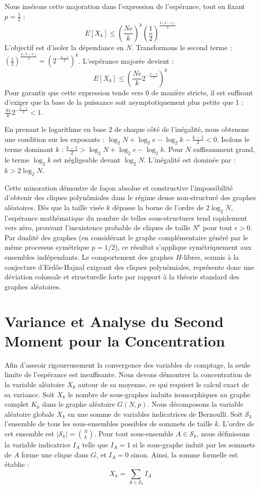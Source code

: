 \documentclass[11pt, a4paper]{article}
\begin{document}
Nous insérons cette majoration dans l'expression de l'espérance, tout en fixant $p = \frac{1}{2}$ :
$$E[X_k] \le \left(\frac{Ne}{k}\right)^k \left(\frac{1}{2}\right)^{\frac{k(k-1)}{2}}$$
L'objectif est d'isoler la dépendance en $N$. Transformons le second terme :
$\left(\frac{1}{2}\right)^{\frac{k(k-1)}{2}} = \left( 2^{-\frac{k-1}{2}} \right)^k$.
L'espérance majorée devient :
$$E[X_k] \le \left( \frac{Ne}{k} 2^{-\frac{k-1}{2}} \right)^k$$
Pour garantir que cette expression tende vers 0 de manière stricte, il est suffisant d'exiger que la base de la puissance soit asymptotiquement plus petite que 1 :
$\frac{Ne}{k} 2^{-\frac{k-1}{2}} < 1$.

En prenant le logarithme en base 2 de chaque côté de l'inégalité, nous obtenons une condition sur les exposants :
$\log_2 N + \log_2 e - \log_2 k - \frac{k-1}{2} < 0$.
Isolons le terme dominant $k$ :
$\frac{k-1}{2} > \log_2 N + \log_2 e - \log_2 k$.
Pour $N$ suffisamment grand, le terme $\log_2 k$ est négligeable devant $\log_2 N$.
L'inégalité est dominée par :
$k > 2 \log_2 N$.

Cette minoration démontre de façon absolue et constructive l'impossibilité d'obtenir des cliques polynômiales dans le régime dense non-structuré des graphes aléatoires. Dès que la taille visée $k$ dépasse la borne de l'ordre de $2 \log_2 N$, l'espérance mathématique du nombre de telles sous-structures tend rapidement vers zéro, prouvant l'inexistence probable de cliques de taille $N^{\epsilon}$ pour tout $\epsilon > 0$. Par dualité des graphes (en considérant le graphe complémentaire généré par le même processus symétrique $p = 1/2$), ce résultat s'applique symétriquement aux ensembles indépendants.
Le comportement des graphes $H$-libres, soumis à la conjecture d'Erdős-Hajnal exigeant des cliques polynômiales, représente donc une déviation colossale et structurelle forte par rapport à la théorie standard des graphes aléatoires.

\newpage
\section{Variance et Analyse du Second Moment pour la Concentration}

Afin d'asseoir rigoureusement la convergence des variables de comptage, la seule limite de l'espérance est insuffisante. Nous devons démontrer la concentration de la variable aléatoire $X_k$ autour de sa moyenne, ce qui requiert le calcul exact de sa variance.
Soit $X_k$ le nombre de sous-graphes induits isomorphiques au graphe complet $K_k$ dans le graphe aléatoire $G(N, p)$.
Nous décomposons la variable aléatoire globale $X_k$ en une somme de variables indicatrices de Bernoulli.
Soit $\mathcal{S}_k$ l'ensemble de tous les sous-ensembles possibles de sommets de taille $k$. L'ordre de cet ensemble est $|\mathcal{S}_k| = \binom{N}{k}$.
Pour tout sous-ensemble $A \in \mathcal{S}_k$, nous définissons la variable indicatrice $I_A$ telle que $I_A = 1$ si le sous-graphe induit par les sommets de $A$ forme une clique dans $G$, et $I_A = 0$ sinon.
Ainsi, la somme formelle est établie :
$$X_k = \sum_{A \in \mathcal{S}_k} I_A$$
\end{document}
